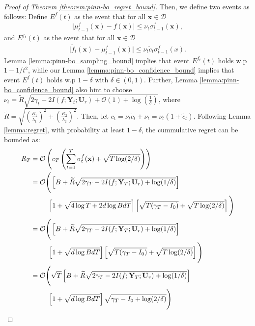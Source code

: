 \begin{proof}[Proof of Theorem \ref{theorem:pinn-bo_regret_bound}]
Then, we define two events as follows:
Define $E^f(t)$ as the event that for all $\mathbf{x} \in \mathcal{D}$
\begin{align*} 
\lvert \mu_{t-1}^f(\mathbf{x}) - f(\mathbf{x}) \rvert \le \nu_t \sigma_{t-1}^f (\mathbf{x}), 
\end{align*}
and $E^{f_t}(t)$ as the event that for all $\mathbf{x} \in \mathcal{D}$
\begin{align*}
    \lvert \widetilde{f}_t(\mathbf{x}) - \mu_{t-1}^f(\mathbf{x})\rvert \le \nu_t \widetilde{c}_t\sigma_{t-1}^f(x).
\end{align*}
Lemma \ref{lemma:pinn-bo_sampling_bound} implies that event $E^{f_t}(t)$ holds w.p $1-1/t^2$, while our Lemma \ref{lemma:pinn-bo_confidence_bound} implies that event $E^f(t)$ holds w.p $1-\delta$ with $\delta \in (0,1)$. Further, Lemma \ref{lemma:pinn-bo_confidence_bound} also hint to choose $\nu_t = \widetilde{R} \sqrt{2\gamma_t - 2 I(f; \mathbf{Y}_t; \mathbf{U}_r) + \mathcal{O}(1) + \log(\frac{1}{\delta})}$, where $\widetilde{R} = \sqrt{\left(\frac{R_1}{\lambda_1}\right)^2 + \left(\frac{R_2}{\lambda_2}\right)^2}$. Then, let $c_t = \nu_t \widetilde{c}_t + \nu_t = \nu_t (1+\widetilde{c}_t)$. Following Lemma \ref{lemma:regret}, with probability at least $1-\delta$, the cummulative regret can be bounded as: 
\begin{align*}
    R_T &= \mathcal{O}\left(c_T\left(\sum_{t=1}^T \sigma_t^f(\mathbf{x}) + \sqrt{T\log(2/\delta)}\right)\right)
    \\
    &= \mathcal{O}\Bigg( \left[B + \widetilde{R}\sqrt{2\gamma_T - 2I(f;\mathbf{Y}_T; \mathbf{U}_r)+\log(1/\delta)} \right] \notag
    \\
    & \;\;\;\;\;\;\;\;\; \left[1 +  \sqrt{4 \log T + 2d\log BdT} \right] \left[ \sqrt{T(\gamma_T - I_0)} + \sqrt{T\log(2/\delta)} \right] \Bigg)
    \\
    &= \mathcal{O}\Bigg( \left[B + \widetilde{R}\sqrt{2\gamma_T - 2I(f;\mathbf{Y}_T; \mathbf{U}_r)+\log(1/\delta)} \right] \notag
    \\
    & \;\;\;\;\;\;\;\;\; \left[1 +  \sqrt{d\log BdT}\right] \left[\sqrt{T(\gamma_T - I_0)} + \sqrt{T\log(2/\delta)}\right] \Bigg) 
    \\
    &= \mathcal{O}\Bigg( \sqrt{T} \left[B + \widetilde{R}\sqrt{2\gamma_T - 2I(f;\mathbf{Y}_T; \mathbf{U}_r)+\log(1/\delta)} \right] \notag 
    \\
    & \;\;\;\;\;\;\;\;\; \left[1 +  \sqrt{d\log BdT}\right]  \sqrt{\gamma_T - I_0 + \log(2/\delta)}   \Bigg)
    \\

\end{align*}
\end{proof}
